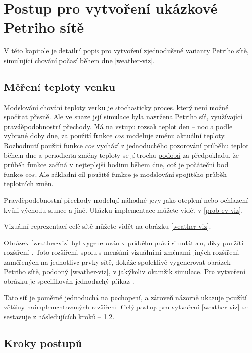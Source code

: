 \chapter{Postup pro vytvoření ukázkové Petriho sítě}
\label{chap:postup}

V této kapitole je detailní popis pro vytvoření zjednodušené varianty Petriho sítě, simulující chování počasí během dne \ref{weather-viz}.

\section{Měření teploty venku}
\label{sec:mereni-teploty}
Modelování chování teploty venku je stochasticky proces, který není možné spočítat přesně. Ale ve snaze její simulace byla navržena Petriho síť, využívající pravděpodobnostní přechody. Má na vstupu rozsah teplot den -- noc a podle vybrané doby dne, za použití funkce $cos$ modeluje změnu aktuální teploty. Rozhodnutí použití funkce $cos$ vychází z jednoduchého pozorování průběhu teplot během dne a periodicita změny teploty se jí trochu \href{https://forecast.weather.gov/MapClick.php?lat=42.3758&lon=-71.1187&lg=english&FcstType=graphical}{podobá} za předpokladu, že průběh funkce začíná v nejteplejší hodinu během dne, což je počáteční bod funkce $cos$. Ale základní cíl použité funkce je modelování spojitého průběh teplotních změn.

Pravděpodobnostní přechody modelují náhodné jevy jako oteplení nebo ochlazení kvůli východu slunce a jiné. Ukázku implementace můžete vidět v \ref{prob-ev-viz}.

Vizuální reprezentací celé sítě můžete vidět na obrázku \ref{weather-viz}.

Obrázek \ref{weather-viz} byl vygenerován v průběhu práci simulátoru, díky použítí rozšíření \href{https://www.ibisc.univ-evry.fr/~fpommereau/SNAKES/API/plugins/gv.html}{}. Toto rozšíření, spolu s menšími vizuálními změnami jiných rozšíření, zaměřených na jednotlivé prvky sítě, dokáže spolehlivě vygenerovat obrázek Petriho sítě, podobný \ref{weather-viz}, v jakýkoliv okamžik simulace. Pro vytvoření obrázku je specifikován jednoduchý příkaz .


Tato síť je poměrně jednoduchá na pochopení, a zároveň názorně ukazuje použítí většiny naimplementovaných rozšíření. Celý postup pro vytvoření \ref{weather-viz} se sestavuje z následujících kroků -- \ref{sec:process-steps}.

\section{Kroky postupů}
\label{sec:process-steps}

